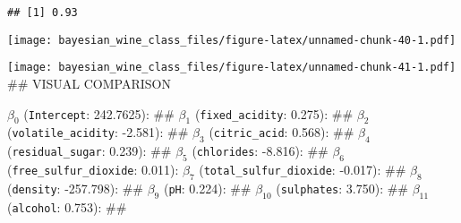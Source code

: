 \documentclass[
]{article}
\begin{document}
\begin{verbatim}
## [1] 0.93
\end{verbatim}

\texttt{[image: bayesian\_wine\_class\_files/figure-latex/unnamed-chunk-40-1.pdf]}

\texttt{[image: bayesian\_wine\_class\_files/figure-latex/unnamed-chunk-41-1.pdf]}
\#\# VISUAL COMPARISON

\(\beta_0\) (\texttt{Intercept}: 242.7625): \#\# \(\beta_1\)
(\texttt{fixed\_acidity}: 0.275): \#\# \(\beta_2\)
(\texttt{volatile\_acidity}: -2.581): \#\# \(\beta_3\)
(\texttt{citric\_acid}: 0.568): \#\# \(\beta_4\)
(\texttt{residual\_sugar}: 0.239): \#\# \(\beta_5\) (\texttt{chlorides}:
-8.816): \#\# \(\beta_6\) (\texttt{free\_sulfur\_dioxide}: 0.011):
\(\beta_7\) (\texttt{total\_sulfur\_dioxide}: -0.017): \#\# \(\beta_8\)
(\texttt{density}: -257.798): \#\# \(\beta_9\) (\texttt{pH}: 0.224):
\#\# \(\beta_{10}\) (\texttt{sulphates}: 3.750): \#\# \(\beta_{11}\)
(\texttt{alcohol}: 0.753): \#\#
\end{document}
